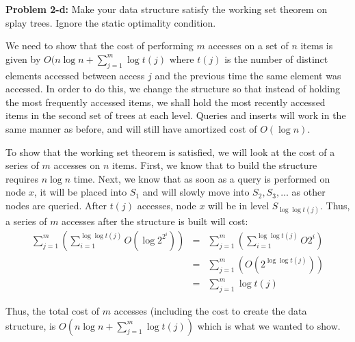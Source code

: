\documentclass[psamsfonts]{amsart}
\newenvironment{sol}{\vspace{0.25cm}{\large \bfseries Solution:}}{\qedsymbol}
\newenvironment{prob}[1]{\begin{framed}{\large \bfseries Problem #1:}}{\end{framed}}
\begin{document}
\begin{prob}{2-d}
Make your data structure satisfy the working set theorem on splay trees. Ignore the static optimality condition.
\end{prob}

\begin{sol}
We need to show that the cost of performing $m$ accesses on a set of $n$ items is given by $O(n \log n + \sum_{j=1}^m \log t(j)$ where $t(j)$ is the number of distinct elements accessed between access $j$ and the previous time the same element was accessed. In order to do this, we change the structure so that instead of holding the most frequently accessed items, we shall hold the most recently accessed items in the second set of trees at each level. Queries and inserts will work in the same manner as before, and will still have amortized cost of $O(\log n)$. 

To show that the working set theorem is satisfied, we will look at the cost of a series of $m$ accesses on $n$ items. First, we know that to build the structure requires $n \log n$ time. Next, we know that as soon as a query is performed on node $x$, it will be placed into $S_1$ and will slowly move into $S_2, S_3, \ldots$ as other nodes are queried. After $t(j)$ accesses, node $x$ will be in level $S_{\log \log t(j)}$. Thus, a series of $m$ accesses after the structure is built will cost:
\begin{eqnarray}
\sum_{j=1}^m \left( \sum_{i=1}^{\log \log t(j)} O(\log 2^{2^{i}}) \right) &=& \sum_{j=1}^m \left( \sum_{i=1}^{\log \log t(j)} O{2^i} \right) \\
&=& \sum_{j=1}^m \left( O(2^{\log \log t(j)}) \right) \\
&=& \sum_{j=1}^m \log t(j)
\end{eqnarray}

Thus, the total cost of $m$ accesses (including the cost to create the data structure, is $O(n \log n + \sum_{j=1}^m \log t(j))$ which is what we wanted to show.
\end{sol}
\end{document}
